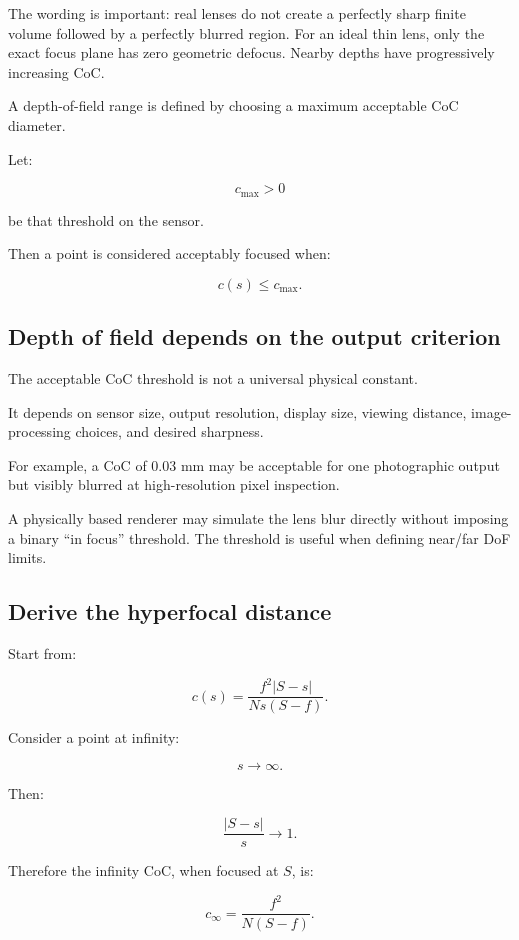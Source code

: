 The wording is important: real lenses do not create a perfectly sharp finite volume followed by a perfectly blurred region. For an ideal thin lens, only the exact focus plane has zero geometric defocus. Nearby depths have progressively increasing CoC.

A depth-of-field range is defined by choosing a maximum acceptable CoC diameter.

Let:

\[ c_{\max}>0 \]

be that threshold on the sensor.

Then a point is considered acceptably focused when:

\[ \boxed{ c(s)\le c_{\max}. } \]

\subsection{Depth of field depends on the output criterion}\label{02-foundations-ii-ch036-depth-of-field-depends-on-the-output-criterion}

The acceptable CoC threshold is not a universal physical constant.

It depends on sensor size, output resolution, display size, viewing distance, image-processing choices, and desired sharpness.

For example, a CoC of 0.03 mm may be acceptable for one photographic output but visibly blurred at high-resolution pixel inspection.

A physically based renderer may simulate the lens blur directly without imposing a binary ``in focus'' threshold. The threshold is useful when defining near/far DoF limits.

\subsection{Derive the hyperfocal distance}\label{02-foundations-ii-ch036-derive-the-hyperfocal-distance}

Start from:

\[ c(s)= \frac{f^2|S-s|}{Ns(S-f)}. \]

Consider a point at infinity:

\[ s\to\infty. \]

Then:

\[ \frac{|S-s|}{s}\to1. \]

Therefore the infinity CoC, when focused at \(S\), is:

\[ \boxed{ c_\infty= \frac{f^2}{N(S-f)}. } \]

